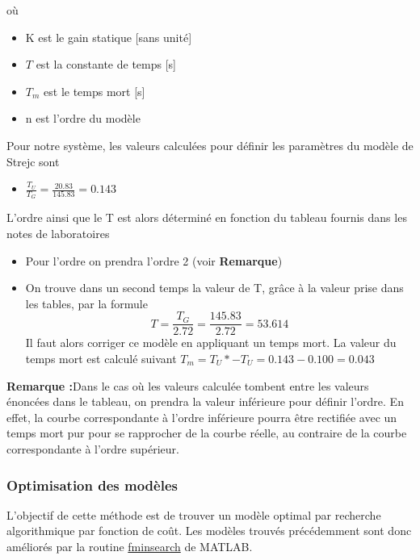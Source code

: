 où 
\begin{itemize}
\item K est le gain statique [sans unité]
\item $T$ est la constante de temps [s]
\item $T_{m}$ est le temps mort [s] 
\item n est l'ordre du modèle
\end{itemize}

Pour notre système, les valeurs calculées pour définir les paramètres du modèle de Strejc sont
\begin{itemize}
\item $\frac{T_{U}}{T_{G}} = \frac{20.83}{145.83} = 0.143$
\end{itemize}

L'ordre ainsi que le T est alors déterminé en fonction du tableau fournis dans les notes de laboratoires 

\begin{itemize}
\item Pour l'ordre on prendra l'ordre 2 (voir \textbf{Remarque})
\item On trouve dans un second temps la valeur de T, grâce à la valeur prise dans les tables, par la formule 
\begin{equation}
T = \frac{T_{G}}{2.72} = \frac{145.83}{2.72} = 53.614
\end{equation}
Il faut alors corriger ce modèle en appliquant un temps mort. La valeur du temps mort est calculé suivant $T_{m} = T_{U}* - T_{U} = 0.143 - 0.100 = 0.043$

\end{itemize}

\textbf{Remarque :}Dans le cas où les valeurs calculée tombent entre les valeurs énoncées dans le tableau, on prendra la valeur inférieure pour définir l'ordre. En effet, la courbe correspondante à l'ordre inférieure pourra être rectifiée avec un temps mort pur pour se rapprocher de la courbe réelle, au contraire de la courbe correspondante à l'ordre supérieur. 

\subsubsection{Optimisation des modèles}
L'objectif de cette méthode est de trouver un modèle optimal par recherche algorithmique par fonction de coût. Les modèles trouvés précédemment sont donc améliorés par la routine \url{fminsearch} de MATLAB.

